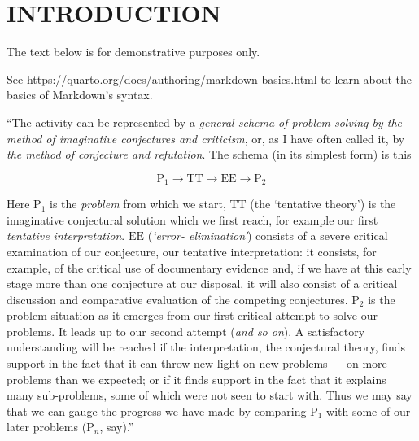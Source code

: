 \documentclass[
  12pt,
  a4paper,
  oneside]{tesesusp}
\begin{document}
\hypertarget{introduction}{%
\chapter{INTRODUCTION}\label{introduction}}

\textual

\begin{tcolorbox}[enhanced jigsaw, opacitybacktitle=0.6, opacityback=0, rightrule=.15mm, coltitle=black, breakable, colframe=quarto-callout-note-color-frame, bottomrule=.15mm, leftrule=.75mm, colback=white, left=2mm, title=\textcolor{quarto-callout-note-color}{\faInfo}\hspace{0.5em}{Note}, titlerule=0mm, arc=.35mm, colbacktitle=quarto-callout-note-color!10!white, toptitle=1mm, toprule=.15mm, bottomtitle=1mm]

The text below is for demonstrative purposes only.

\vspace{5pt}

See \url{https://quarto.org/docs/authoring/markdown-basics.html} to
learn about the basics of Markdown's syntax.

\end{tcolorbox}

\vspace{10pt}

``The activity can be represented by a \emph{general schema of
problem-solving by the method of imaginative conjectures and criticism},
or, as I have often called it, by \emph{the method of conjecture and
refutation}. The schema (in its simplest form) is this

\[
\text{P}_{1} \to \text{TT} \to \text{EE} \to \text{P}_{2} 
\]

\vspace{15pt}

Here \(\text{P}_{1}\) is the \emph{problem} from which we start,
\(\text{TT}\) (the `tentative theory') is the imaginative conjectural
solution which we first reach, for example our first \emph{tentative
interpretation}. \(\text{EE}\) (\emph{`error- elimination'}) consists of
a severe critical examination of our conjecture, our tentative
interpretation: it consists, for example, of the critical use of
documentary evidence and, if we have at this early stage more than one
conjecture at our disposal, it will also consist of a critical
discussion and comparative evaluation of the competing conjectures.
\(\text{P}_{2}\) is the problem situation as it emerges from our first
critical attempt to solve our problems. It leads up to our second
attempt (\emph{and so on}). A satisfactory understanding will be reached
if the interpretation, the conjectural theory, finds support in the fact
that it can throw new light on new problems --- on more problems than we
expected; or if it finds support in the fact that it explains many
sub-problems, some of which were not seen to start with. Thus we may say
that we can gauge the progress we have made by comparing
\(\text{P}_{1}\) with some of our later problems (\(\text{P}_{n}\),
say).''
\end{document}
